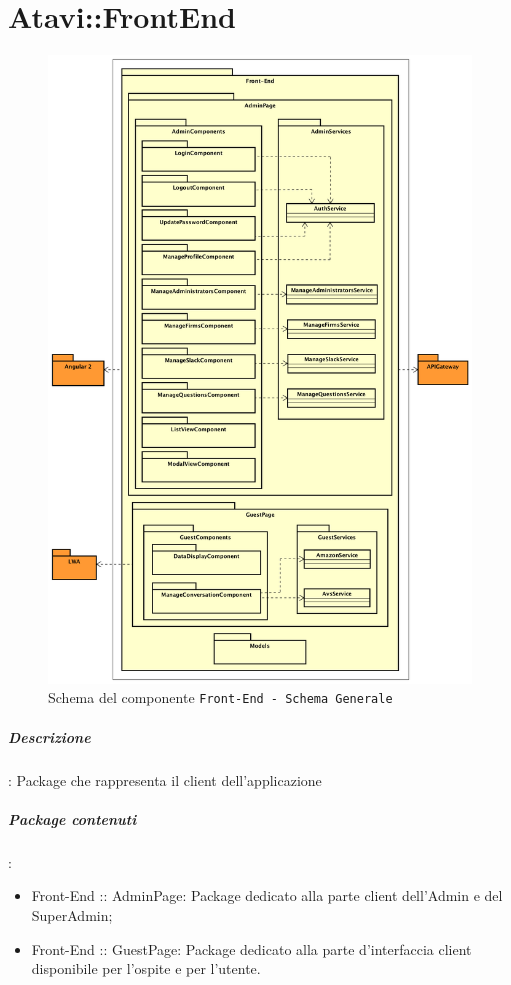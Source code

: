 \documentclass[../ManualeSviluppatore_v1.0.0.tex]{subfiles}
\begin{document}
\section{Atavi::FrontEnd}

	\begin{figure}[!h]
		\centering
		\includegraphics[scale=0.3]{Architettura/Front-end.png}
		\caption{Schema del componente \texttt{Front-End - Schema Generale}}
	\end{figure}
	\subparagraph{Descrizione}: Package che rappresenta il client dell'applicazione
	\subparagraph{Package contenuti}:
	\begin{itemize}
		\item Front-End :: AdminPage: Package dedicato alla parte client dell'Admin e del SuperAdmin;
		\item Front-End :: GuestPage: Package dedicato alla parte d'interfaccia client disponibile per l'ospite e per l'utente.
	\end{itemize}
\end{document}
